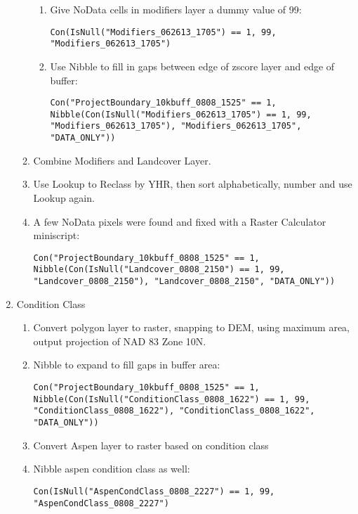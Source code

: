 \begin{enumerate}
\begin{enumerate}
        \begin{enumerate}
        \item Give NoData cells in modifiers layer a dummy value of 99:  \begin{lstlisting}
Con(IsNull("Modifiers_062613_1705") == 1, 99, "Modifiers_062613_1705") \end{lstlisting}
        \item Use Nibble to fill in gaps between edge of zscore layer and edge of buffer: \begin{lstlisting}
Con("ProjectBoundary_10kbuff_0808_1525" == 1, Nibble(Con(IsNull("Modifiers_062613_1705") == 1, 99, "Modifiers_062613_1705"), "Modifiers_062613_1705", "DATA_ONLY")) \end{lstlisting}
        \end{enumerate}
    \item Combine Modifiers and Landcover Layer.
    \item Use Lookup to Reclass by YHR, then sort alphabetically, number and use Lookup again.
    \item A few NoData pixels were found and fixed with a Raster Calculator miniscript:
    \begin{lstlisting}
Con("ProjectBoundary_10kbuff_0808_1525" == 1, Nibble(Con(IsNull("Landcover_0808_2150") == 1, 99, "Landcover_0808_2150"), "Landcover_0808_2150", "DATA_ONLY")) \end{lstlisting}
    \end{enumerate}
\item Condition Class
    \begin{enumerate}
        \item Convert polygon layer to raster, snapping to DEM, using maximum area, output projection of NAD 83 Zone 10N.
        \item Nibble to expand to fill gaps in buffer area:
        \begin{lstlisting}
Con("ProjectBoundary_10kbuff_0808_1525" == 1, Nibble(Con(IsNull("ConditionClass_0808_1622") == 1, 99, "ConditionClass_0808_1622"), "ConditionClass_0808_1622", "DATA_ONLY")) \end{lstlisting}
        \item Convert Aspen layer to raster based on condition class
        \item Nibble aspen condition class as well:
        \begin{lstlisting}
Con(IsNull("AspenCondClass_0808_2227") == 1, 99, "AspenCondClass_0808_2227") \end{lstlisting}

\end{enumerate}
\end{enumerate}
